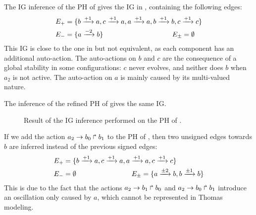 \begin{example}
The IG inference of the PH of  gives the
IG in , containing the following edges:
\begin{align*}
  E_+ &= \{b \xrightarrow{+ 1} a, c \xrightarrow{+ 1} a, a \xrightarrow{+ 1} a, b \xrightarrow{+ 1} b, c \xrightarrow{+ 1} c\}\\
  E_- &= \{a \xrightarrow{- 2} b\} \qquad\qquad\qquad\qquad\qquad
  E_\pm = \emptyset
\end{align*}
This IG is close to the one in  but not equivalent,
as each component has an additional auto-action.
The auto-actions on $b$ and $c$ are the consequence of a global stability
in some configurations: $c$ never evolves, and neither does $b$ when $a_2$ is not active.
The auto-action on $a$ is mainly caused by its multi-valued nature.

The inference of the refined PH of  gives the same IG.

\begin{figure}[t]
\centering
{}
\caption{\label{fig:BRN-inf1}
  Result of the IG inference performed on the PH of .
}
\end{figure}

\end{example}


\begin{example}
If we add the action $a_2\rightarrow b_0\Rsh b_1$ to the PH of ,
then two unsigned edges towards $b$ are inferred instead of the previous signed edges:
\begin{align*}
  E_+ &= \{b \xrightarrow{+ 1} a, c \xrightarrow{+ 1} a, a \xrightarrow{+ 1} a, c \xrightarrow{+ 1} c\}\\
  E_- &= \emptyset \qquad\qquad\qquad\qquad
  E_\pm = \{a \xrightarrow{\pm 2} b, b \xrightarrow{\pm 1} b\}
\end{align*}
This is due to the fact that the actions $a_2\rightarrow b_1\Rsh b_0$ and $a_2\rightarrow b_0\Rsh b_1$
introduce an oscillation only caused by $a$, which cannot be represented in Thomas modeling.
\end{example}



